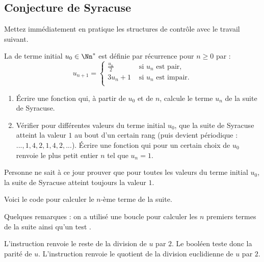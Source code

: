 \documentclass[class=report,crop=false]{standalone}
\begin{document}
    

\subsection{Conjecture de Syracuse}

Mettez immédiatement en pratique les structures de contrôle avec le travail suivant.

\begin{tp}
La  de terme initial $u_0 \in \Nn^*$ est définie par récurrence
pour $n\ge0$ par :
$$u_{n+1} = 
\begin{cases}
  \frac{u_n}{2} & \text{ si $u_n$ est pair,} \\
  3u_n + 1 & \text{ si $u_n$ est impair.} \\
  \end{cases}$$
\begin{enumerate}
  \item \'Ecrire une fonction qui, à partir de $u_0$ et de $n$, calcule le terme $u_n$ de la suite de Syracuse.
  \item Vérifier pour différentes valeurs du terme initial $u_0$, que la suite de Syracuse
  atteint la valeur $1$ au bout d'un certain rang (puis devient périodique : 
  $...,1,4,2,1,4,2,...$). \'Ecrire une fonction qui pour un certain choix de $u_0$ 
  renvoie le plus petit entier $n$ tel que $u_n=1$.
\end{enumerate}

\end{tp}
Personne ne sait à ce jour prouver que pour toutes les valeurs du terme initial $u_0$,
la suite de Syracuse atteint toujours la valeur $1$.

Voici le code pour calculer le $n$-ème terme de la suite.

Quelques remarques : on a utilisé une boucle  pour calculer les $n$ premiers
termes de la suite ainsi qu'un test . 

L'instruction  renvoie le reste de la division de $u$ par $2$. 
Le booléen  teste donc la parité de $u$.
L'instruction  renvoie le quotient de la division euclidienne de $u$ par $2$.
\end{document}
